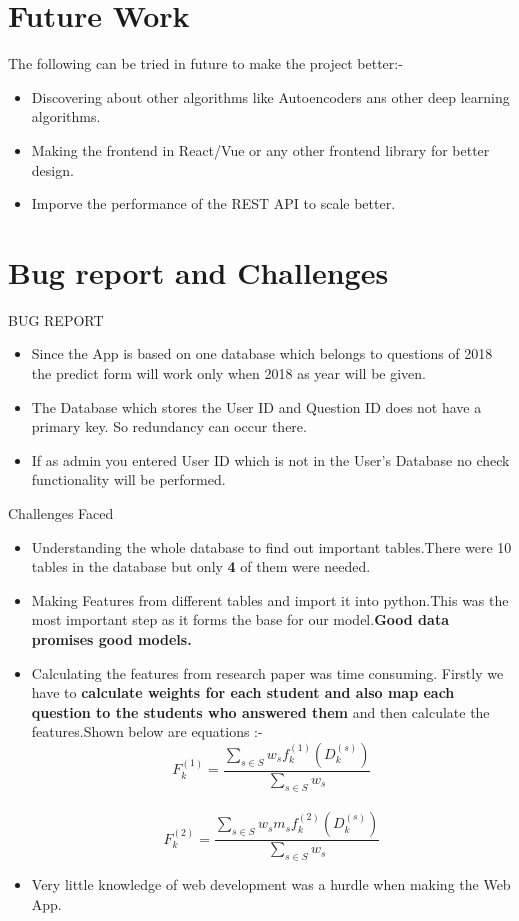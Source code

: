 \documentclass[a4paper,12pt,oneside]{book}
\begin{document}
\section{Future Work}
The following can be tried in future to make the project better:-
\begin{itemize}
    \item Discovering about other algorithms like Autoencoders ans other deep learning algorithms.
    \item Making the frontend in React/Vue or any other frontend library for better design.
    \item Imporve the performance of the REST API to scale better.
\end{itemize}

\section{Bug report and Challenges}
BUG REPORT
\begin{itemize}
    \item Since the App is based on one database which belongs to questions of 2018 the predict form will work only when 2018 as year will be given.
    \item The Database which stores the User ID and Question ID does not have a primary key. So redundancy can occur there.
    \item If as admin you entered User ID which is not in the User's Database no check  functionality will be performed.
\end{itemize}
Challenges Faced
\begin{itemize}
		
		\item Understanding the whole database to find out important tables.There were 10 tables in the database but only \textbf{4} of them were needed.\\ 
		
		\item Making Features from different tables and import it into python.This was the most important step as it forms the base for our model.\textbf{Good data promises good models.}\\ 
		
		\item Calculating the features from research paper was time consuming. Firstly we have to \textbf{calculate weights for each student and also map each question to the students who answered them} and then calculate the features.Shown below are  equations :- \\
		\begin{equation}
		    F_{k}^{(1)} = \frac{\sum_{s\in S} w_{s} f_{k}^{(1)} (D_{k}^{(s)})}{\sum_{s\in S} w_{s}}
		\end{equation}
		\\
		\begin{equation}
		    F_{k}^{(2)} = \frac{\sum_{s\in S} w_{s} m_{s} f_{k}^{(2)} (D_{k}^{(s)})}{\sum_{s\in S} w_{s}}
		\end{equation}
		\item Very little knowledge of web development was a hurdle when making the Web App.
	\end{itemize}
\end{document}
